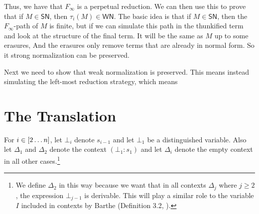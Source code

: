 \documentclass{article}
\begin{document}
Thus, we have that $F_\infty$ is a perpetual reduction.
We can then use this to prove that if $M \in \mathsf{SN}$, then $\tau_i(M) \in \mathsf{WN}$.
The basic idea is that if $M \in \mathsf{SN}$, then the $F_\infty$-path of $M$ is finite, but if we can simulate this path in the thunkified term and look at the structure of the final term. It will be the same as $M$ up to some erasures, And the erasures only remove terms that are already in normal form.
So it strong normalization can be preserved.

Next we need to show that weak normalization is preserved. This means instead simulating the left-most reduction strategy, which means 

\section{The Translation}

\begin{definition}
For $i \in [2\dots n]$, let $\bot_i$ denote $s_{i - 1}$ and let $\bot_1$ be a distinguished variable.
Also let $\Delta_1$ and $\Delta_2$ denote the context $(\bot_1 : s_1)$ and let $\Delta_i$ denote the empty context in all other cases.\footnote{We define $\Delta_2$ in this way because we want that in all contexts $\Delta_j$ where $j \geq 2$, the expression $\bot_{j - 1}$ is derivable. This will play a similar role to the variable $I$ included in contexts by Barthe \etal (Definition 3.2, \cite{barthe-et-al-2001}).}
\end{definition}
\end{document}
